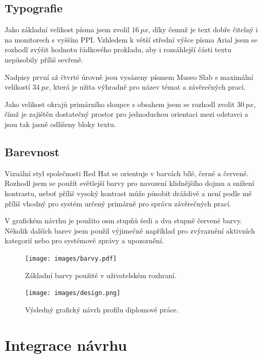 \subsection{Typografie}

Jako základní velikost písma jsem zvolil $16~px$, díky čemuž je text dobře čitelný i na monitorech s vyšším PPI. Vzhledem k větší střední výšce písma Arial jsem se rozhodl zvýšit hodnotu řádkového prokladu, aby i rozsáhlejší části textu nepůsobily příliš sevřeně.

Nadpisy první až čtvrté úrovně jsou vysázeny písmem Museo Slab s maximální velikostí $34~px$, která je užita výhradně pro název témat a závěrečných prací.

Jako velikost okrajů primárního sloupce s obsahem jsem se rozhodl zvolit $30~px$, čímž je zajištěn dostatečný prostor pro jednoduchou orientaci mezi odstavci a jsou tak jasně odlišeny bloky textu.

\subsection{Barevnost}

Vizuální styl společnosti Red Hat se orientuje v barvách bílé, černé a červené. Rozhodl jsem se použít světlejší barvy pro navození klidnějšího dojmu a snížení kontrastu, neboť příliš vysoký kontrast může působit dráždivě a není podle mě příliš vhodný pro systém určený primárně pro správu závěrečných prací.

V grafickém návrhu je použito osm stupňů šedi a dva stupně červené barvy. Několik dalších barev jsem použil výjimečně například pro zvýraznění aktivních kategorií nebo pro systémové zprávy a upozornění.

\begin{figure}[htbp]
    \centering
    \texttt{[image: images/barvy.pdf]}
    \caption{Základní barvy použité v uživatelském rozhraní.}
    \label{img:colors}
\end{figure}

\begin{figure}[htbp]
    \centering
    \texttt{[image: images/design.png]}
    \caption{Výsledný grafický návrh profilu diplomové práce.}
    \label{img:design}
\end{figure}

\section{Integrace návrhu}

